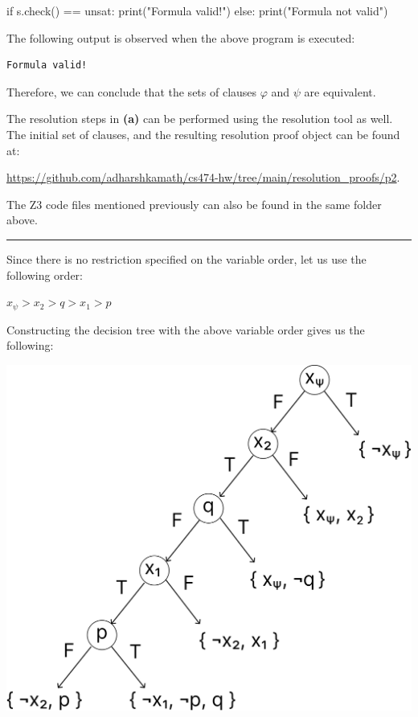 \documentclass[12pt,letterpaper, onecolumn]{exam}
\newcommand{\link}[1]{{\color{blue}\href{#1}{#1}}}
\begin{document}
\begin{questions}
\begin{python}
if s.check() == unsat:
	print("Formula valid!")
else:
	print("Formula not valid")
\end{python}

The following output is observed when the above program is executed:
\begin{lstlisting}
Formula valid!
\end{lstlisting}

Therefore, we can conclude that the sets of clauses $ \varphi $ and $ \psi $ are equivalent. 

The resolution steps in \textbf{(a)} can be performed using the resolution tool as well.
The initial set of clauses, and the resulting resolution proof object can be found at:

\link{https://github.com/adharshkamath/cs474-hw/tree/main/resolution\_proofs/p2}.

The Z3 code files mentioned previously can also be found in the same folder above.


    {\rule{17cm}{0.4pt}}
	\question[]
	\solutiontitle

	Since there is no restriction specified on the variable order, let us use the following order: 
	
	$ x_{\psi} > x_2 > q > x_1 > p $ 

	Constructing the decision tree with the above variable order gives us the following:

	\begin{center}
	\includegraphics[scale=0.22]{decision_tree.png}
	\end{center}


\end{questions}
\end{document}

